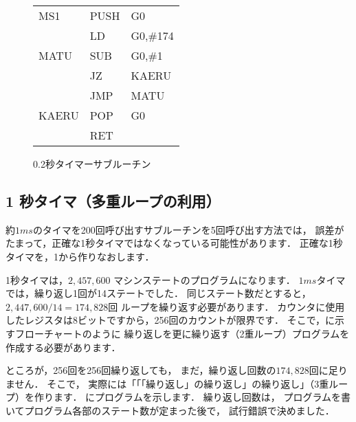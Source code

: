 \begin{figure}[btp]
{\begin{center}
\begin{tabular}{|l|l l|}
MS1   & PUSH & G0                                  \\
      & LD   & G0,\#174                            \\
MATU  & SUB  & G0,\#1                              \\
      & JZ   & KAERU                               \\
      & JMP  & MATU                                \\
KAERU & POP  & G0                                  \\
      & RET  &                                     \\
\hline
\end{tabular}
\end{center}}
\caption{0.2秒タイマーサブルーチン}
\label{fig:chap6:200ms}
\end{figure}

\subsection{1 秒タイマ（多重ループの利用）}

約$1ms$のタイマを200回呼び出すサブルーチンを5回呼び出す方法では，
誤差がたまって，正確な1秒タイマではなくなっている可能性があります．
正確な1秒タイマを，1から作りなおします．

1秒タイマは，$2,457,600$ マシンステートのプログラムになります．
$1ms$タイマでは，繰り返し1回が14ステートでした．
同じステート数だとすると，
$2,447,600 / 14 = 174,828回$ ループを繰り返す必要があります．
カウンタに使用したレジスタは8ビットですから，256回のカウントが限界です．
そこで，に示すフローチャートのように
繰り返しを更に繰り返す（2重ループ）プログラムを作成する必要があります．


ところが，256回を256回繰り返しても，
まだ，繰り返し回数の$174,828回$に足りません．
そこで，
実際には「「「繰り返し」の繰り返し」の繰り返し」（3重ループ）を作ります．
にプログラムを示します．
繰り返し回数は，
プログラムを書いてプログラム各部のステート数が定まった後で，
試行錯誤で決めました．

